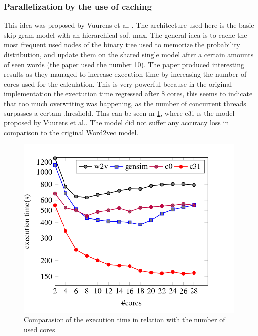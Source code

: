 \subsubsection{Parallelization by the use of caching}
This idea was proposed by Vuurens et al. \cite{efficient}. The architecture used here is the basic skip gram model with an hierarchical soft max.  The general idea is to cache the most frequent used nodes of the binary tree used to memorize the probability distribution, and update them on the shared single model after a certain amounts of seen words (the paper used the number 10). The paper produced interesting results as they managed to increase execution time by increasing the number of cores used for the calculation. This is very powerful because in the original implementation the exectution time regressed after 8 cores, this seems to indicate that too much overwriting was happening, as the number of concurrent threads surpasses a certain threshold. This can be seen in \ref{fig:efficient}, where c31 is the model proposed by Vuurens et al.\cite{efficient}. The model did not suffer any accuracy loss in comparison to the original Word2vec model. 
\begin{figure}[ht]
    \centering
			\includegraphics[scale=0.3]{images/cachingEfficiency.png} 
    \caption{Comparasion of the execution time in relation with the number of used cores \cite{efficient}}
    \label{fig:efficient}
\end{figure}

